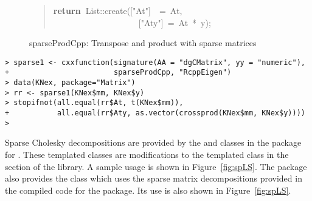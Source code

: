 \documentclass[shortnames,article]{jss}
\newcommand{\hlstd}[1]{\textcolor[rgb]{0,0,0}{#1}}
\newcommand{\hlopt}[1]{\textcolor[rgb]{0,0,0}{#1}}
\newcommand{\hlstr}[1]{\textcolor[rgb]{0.90,0.15,0.15}{#1}}
\newcommand{\hlkwa}[1]{\textcolor[rgb]{0.61,0.13,0.93}{\bf{#1}}}
\newcommand{\hlkwd}[1]{\textcolor[rgb]{0,0,0}{#1}}
\begin{document}
\begin{figure}[htb]
\begin{quote}
    \hlstd{}\hlkwa{return\ }\hlstd{List}\hlopt{::}\hlstd{}\hlkwd{create}\hlstd{}\hlopt{(}\hlstd{\textunderscore }\hlopt{{[}}\hlstd{}\hlstr{"At"}\hlstd{}\hlopt{{]}}\hlstd{\ \ }\hlopt{=\ }\hlstd{At}\hlopt{,}\hspace*{\fill}\\
    \hlstd{}\hlstd{\ \ \ \ \ \ \ \ \ \ \ \ \ \ \ \ \ \ \ \ }\hlstd{\textunderscore }\hlopt{{[}}\hlstd{}\hlstr{"Aty"}\hlstd{}\hlopt{{]}\ =\ }\hlstd{At\ }\hlopt{{*}\ }\hlstd{y}\hlopt{);}\hlstd{}\hspace*{\fill}
    \normalfont
    \normalsize
    \caption{sparseProdCpp: Transpose and product with sparse matrices}
    \label{sparseProd}
  \end{quote}
\end{figure}

\begin{verbatim}
> sparse1 <- cxxfunction(signature(AA = "dgCMatrix", yy = "numeric"),
+                        sparseProdCpp, "RcppEigen")
> data(KNex, package="Matrix")
> rr <- sparse1(KNex$mm, KNex$y)
> stopifnot(all.equal(rr$At, t(KNex$mm)),
+           all.equal(rr$Aty, as.vector(crossprod(KNex$mm, KNex$y))))
> 
\end{verbatim}

Sparse Cholesky decompositions are provided by the
 and  classes in the
 package for .  These templated classes are
modifications to the  templated class in the
 section of the  library.  A sample usage
is shown in Figure~\ref{fig:spLS}.  The  package also
provides the  class which uses the
 sparse matrix decompositions provided in the compiled
code for the  package.  Its use is also shown in
Figure~\ref{fig:spLS}.

\end{document}
